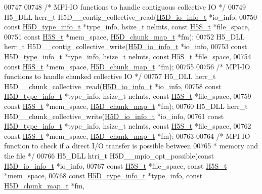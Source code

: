 \begin{DoxyCode}
00747 
00748 \textcolor{comment}{/* MPI-IO functions to handle contiguous collective IO */}
00749 H5\_DLL herr\_t H5D\_\_contig\_collective\_read(\hyperlink{struct_h5_d__io__info__t}{H5D\_io\_info\_t} *io\_info,
00750     \textcolor{keyword}{const} \hyperlink{struct_h5_d__type__info__t}{H5D\_type\_info\_t} *type\_info, hsize\_t nelmts, \textcolor{keyword}{const} \hyperlink{struct_h5_s__t}{H5S\_t} *file\_space,
00751     \textcolor{keyword}{const} \hyperlink{struct_h5_s__t}{H5S\_t} *mem\_space, \hyperlink{struct_h5_d__chunk__map__t}{H5D\_chunk\_map\_t} *fm);
00752 H5\_DLL herr\_t H5D\_\_contig\_collective\_write(\hyperlink{struct_h5_d__io__info__t}{H5D\_io\_info\_t} *io\_info,
00753     \textcolor{keyword}{const} \hyperlink{struct_h5_d__type__info__t}{H5D\_type\_info\_t} *type\_info, hsize\_t nelmts, \textcolor{keyword}{const} \hyperlink{struct_h5_s__t}{H5S\_t} *file\_space,
00754     \textcolor{keyword}{const} \hyperlink{struct_h5_s__t}{H5S\_t} *mem\_space, \hyperlink{struct_h5_d__chunk__map__t}{H5D\_chunk\_map\_t} *fm);
00755 
00756 \textcolor{comment}{/* MPI-IO functions to handle chunked collective IO */}
00757 H5\_DLL herr\_t H5D\_\_chunk\_collective\_read(\hyperlink{struct_h5_d__io__info__t}{H5D\_io\_info\_t} *io\_info,
00758     \textcolor{keyword}{const} \hyperlink{struct_h5_d__type__info__t}{H5D\_type\_info\_t} *type\_info, hsize\_t nelmts, \textcolor{keyword}{const} \hyperlink{struct_h5_s__t}{H5S\_t} *file\_space,
00759     \textcolor{keyword}{const} \hyperlink{struct_h5_s__t}{H5S\_t} *mem\_space, \hyperlink{struct_h5_d__chunk__map__t}{H5D\_chunk\_map\_t} *fm);
00760 H5\_DLL herr\_t H5D\_\_chunk\_collective\_write(\hyperlink{struct_h5_d__io__info__t}{H5D\_io\_info\_t} *io\_info,
00761     \textcolor{keyword}{const} \hyperlink{struct_h5_d__type__info__t}{H5D\_type\_info\_t} *type\_info, hsize\_t nelmts, \textcolor{keyword}{const} \hyperlink{struct_h5_s__t}{H5S\_t} *file\_space,
00762     \textcolor{keyword}{const} \hyperlink{struct_h5_s__t}{H5S\_t} *mem\_space, \hyperlink{struct_h5_d__chunk__map__t}{H5D\_chunk\_map\_t} *fm);
00763 
00764 \textcolor{comment}{/* MPI-IO function to check if a direct I/O transfer is possible between}
00765 \textcolor{comment}{ * memory and the file */}
00766 H5\_DLL htri\_t H5D\_\_mpio\_opt\_possible(\textcolor{keyword}{const} \hyperlink{struct_h5_d__io__info__t}{H5D\_io\_info\_t} *io\_info,
00767     \textcolor{keyword}{const} \hyperlink{struct_h5_s__t}{H5S\_t} *file\_space, \textcolor{keyword}{const} \hyperlink{struct_h5_s__t}{H5S\_t} *mem\_space,
00768     \textcolor{keyword}{const} \hyperlink{struct_h5_d__type__info__t}{H5D\_type\_info\_t} *type\_info, \textcolor{keyword}{const} \hyperlink{struct_h5_d__chunk__map__t}{H5D\_chunk\_map\_t} *fm,

\end{DoxyCode}
